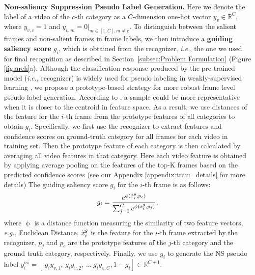 \documentclass[runningheads]{llncs}
\begin{document}
\noindent \textbf{Non-saliency Suppression Pseudo Label Generation.}
Here we denote the label of a video of the $c$-th category as a $C$-dimension one-hot vector $y_v\in \mathbb{R}^{C}$, where $y_{v,c}=1$ and $y_{v,m}=0|_{m\in[1,C], m\neq c}$. 
To distinguish between the salient frames and non-salient frames in frame labels, we then introduce a \textbf{guiding saliency score} $g_i$, which is obtained from the recognizer, \emph{i.e.}, the one we used for final recognition as described in Section~\ref{subsec:Problem Formulation} (Figure \ref{fig:arch}a). Although the classification response produced by the pre-trained model (\emph{i.e.,} recognizer) is widely used for pseudo labeling in weakly-supervised learning \cite{wsod_oicr,bgmodel,wsss}, we propose a prototype-based strategy for more robust frame level pseudo label generation.
According to \cite{proto_network,zhang2020discriminability}, a sample could be more representative when it is closer to the centroid in feature space. As a result, we use distances of the feature for the $i$-th frame from the prototype features of all categories to obtain  $g_i$.
Specifically, we first use the recognizer to extract features and confidence scores on ground-truth category for all frames for each video in training set. Then the prototype feature of each category is then calculated by averaging all video features in that category. Here each video feature is obtained by applying average pooling on the features of the top-K frames based on the predicted confidence scores (see our Appendix \ref{appendix:train_details} for more details)
The guiding saliency score $g_i$ for the $i$-th frame is as follows:
\begin{equation}
    g_{i} = \frac{e^{\phi(\Tilde{x}^{g}_i,p_c)}}{\sum_{j=1}^{C} e^{\phi(\Tilde{x}^{g}_i,p_j)}}, 
\end{equation}
where $\operatorname{\phi}$ is a distance function measuring the similarity of two feature vectors, \emph{e.g.,} Euclidean Distance, $\Tilde{x}^{g}_i$ is the feature for the $i$-th frame extracted by the recognizer, $p_j$ and $p_c$ are the prototype features of the $j$-th category and the ground truth category, respectively.
Finally, we use $g_i$ to generate the NS pseudo label $y^{ns}_i= [\ g_iy_{v,1},\ g_iy_{v,2},\ ...\  g_iy_{v,C},1-g_i]\in \mathbb{R}^{C+1}$.
\end{document}

